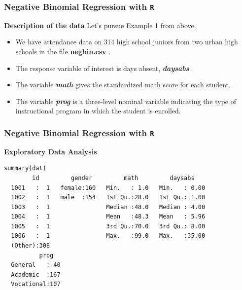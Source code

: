 \documentclass[MASTER.tex]{subfiles}
\begin{document}
\begin{frame}[fragile]
	\frametitle{Negative Binomial Regression with \texttt{R} }
	\Large
	
\textbf{Description of the data}
Let's pursue Example 1 from above.
\begin{itemize}
\item We have attendance data on 314 high school juniors from two urban high schools in the file \textbf{negbin.csv }. 
\item The response variable of interest is days absent, \textbf{\textit{daysabs}}. 
\item The variable \textbf{\textit{math}} gives the standardized math score for each student. 
\item The variable \textbf{\textit{prog}} is a three-level nominal variable indicating the type of instructional program in which the student is enrolled.
\end{itemize}
\end{frame}
	


\begin{frame}[fragile]
\frametitle{Negative Binomial Regression with \texttt{R} }
\normalsize
\textbf{Exploratory Data Analysis}

\begin{verbatim}	
summary(dat)
        id         gender         math         daysabs     
  1001   :  1   female:160   Min.   : 1.0   Min.   : 0.00  
  1002   :  1   male  :154   1st Qu.:28.0   1st Qu.: 1.00  
  1003   :  1                Median :48.0   Median : 4.00  
  1004   :  1                Mean   :48.3   Mean   : 5.96  
  1005   :  1                3rd Qu.:70.0   3rd Qu.: 8.00  
  1006   :  1                Max.   :99.0   Max.   :35.00  
  (Other):308                                              
          prog    
  General   : 40  
  Academic  :167  
  Vocational:107  
\end{verbatim}	

	
               
\end{frame}
\end{document}
